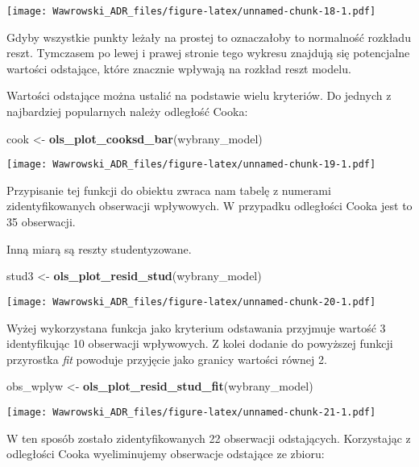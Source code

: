 \documentclass[]{book}
\newenvironment{Shaded}{\begin{snugshade}}{\end{snugshade}}
\newcommand{\KeywordTok}[1]{\textcolor[rgb]{0.13,0.29,0.53}{\textbf{#1}}}
\newcommand{\StringTok}[1]{\textcolor[rgb]{0.31,0.60,0.02}{#1}}
\newcommand{\NormalTok}[1]{#1}
\begin{document}
\texttt{[image: Wawrowski\_ADR\_files/figure-latex/unnamed-chunk-18-1.pdf]}

Gdyby wszystkie punkty leżały na prostej to oznaczałoby to normalność
rozkładu reszt. Tymczasem po lewej i prawej stronie tego wykresu
znajdują się potencjalne wartości odstające, które znacznie wpływają na
rozkład reszt modelu.

Wartości odstające można ustalić na podstawie wielu kryteriów. Do
jednych z najbardziej popularnych należy odległość Cooka:

\begin{Shaded}
\begin{Highlighting}[]
\NormalTok{cook <-}\StringTok{ }\KeywordTok{ols_plot_cooksd_bar}\NormalTok{(wybrany_model)}
\end{Highlighting}
\end{Shaded}

\texttt{[image: Wawrowski\_ADR\_files/figure-latex/unnamed-chunk-19-1.pdf]}

Przypisanie tej funkcji do obiektu zwraca nam tabelę z numerami
zidentyfikowanych obserwacji wpływowych. W przypadku odległości Cooka
jest to 35 obserwacji.

Inną miarą są reszty studentyzowane.

\begin{Shaded}
\begin{Highlighting}[]
\NormalTok{stud3 <-}\StringTok{ }\KeywordTok{ols_plot_resid_stud}\NormalTok{(wybrany_model)}
\end{Highlighting}
\end{Shaded}

\texttt{[image: Wawrowski\_ADR\_files/figure-latex/unnamed-chunk-20-1.pdf]}

Wyżej wykorzystana funkcja jako kryterium odstawania przyjmuje wartość 3
identyfikując 10 obserwacji wpływowych. Z kolei dodanie do powyższej
funkcji przyrostka \emph{fit} powoduje przyjęcie jako granicy wartości
równej 2.

\begin{Shaded}
\begin{Highlighting}[]
\NormalTok{obs_wplyw <-}\StringTok{ }\KeywordTok{ols_plot_resid_stud_fit}\NormalTok{(wybrany_model)}
\end{Highlighting}
\end{Shaded}

\texttt{[image: Wawrowski\_ADR\_files/figure-latex/unnamed-chunk-21-1.pdf]}

W ten sposób zostało zidentyfikowanych 22 obserwacji odstających.
Korzystając z odległości Cooka wyeliminujemy obserwacje odstające ze
zbioru:
\end{document}

